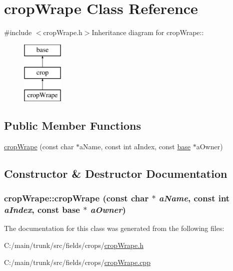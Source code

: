 \hypertarget{classcrop_wrape}{
\section{cropWrape Class Reference}
\label{classcrop_wrape}
}


{\ttfamily \#include $<$cropWrape.h$>$}Inheritance diagram for cropWrape::\begin{figure}[H]
\begin{center}
\leavevmode
\includegraphics[height=3cm]{classcrop_wrape}
\end{center}
\end{figure}
\subsection*{Public Member Functions}
\begin{DoxyCompactItemize}
\item 
\hyperlink{classcrop_wrape_a81c425bc245acec05afb58bfe0eb8964}{cropWrape} (const char $\ast$aName, const int aIndex, const \hyperlink{classbase}{base} $\ast$aOwner)
\end{DoxyCompactItemize}


\subsection{Constructor \& Destructor Documentation}
\hypertarget{classcrop_wrape_a81c425bc245acec05afb58bfe0eb8964}{
\subsubsection[{cropWrape}]{\setlength{\rightskip}{0pt plus 5cm}cropWrape::cropWrape (const char $\ast$ {\em aName}, \/  const int {\em aIndex}, \/  const {\bf base} $\ast$ {\em aOwner})}}
\label{classcrop_wrape_a81c425bc245acec05afb58bfe0eb8964}


The documentation for this class was generated from the following files:\begin{DoxyCompactItemize}
\item 
C:/main/trunk/src/fields/crops/\hyperlink{crop_wrape_8h}{cropWrape.h}\item 
C:/main/trunk/src/fields/crops/\hyperlink{crop_wrape_8cpp}{cropWrape.cpp}\end{DoxyCompactItemize}
